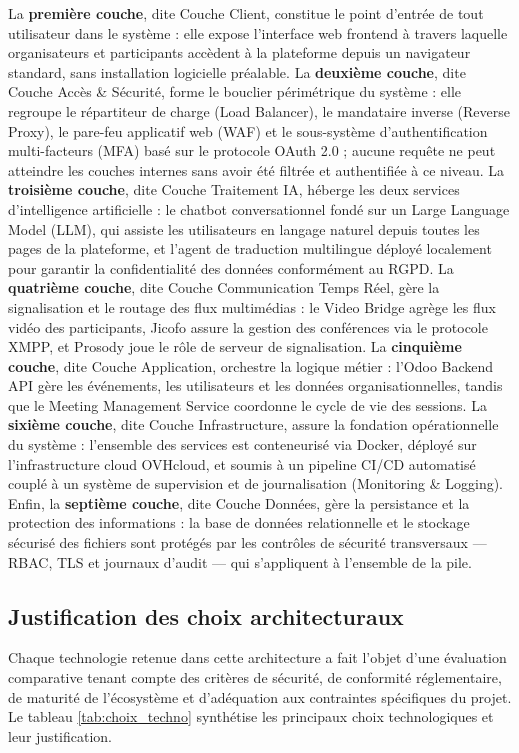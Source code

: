 La \textbf{première couche}, dite Couche Client, constitue le point d'entrée de tout utilisateur dans le système : elle expose l'interface web frontend à travers laquelle organisateurs et participants accèdent à la plateforme depuis un navigateur standard, sans installation logicielle préalable. La \textbf{deuxième couche}, dite Couche Accès \& Sécurité, forme le bouclier périmétrique du système : elle regroupe le répartiteur de charge (Load Balancer), le mandataire inverse (Reverse Proxy), le pare-feu applicatif web (WAF) et le sous-système d'authentification multi-facteurs (MFA) basé sur le protocole OAuth 2.0 ; aucune requête ne peut atteindre les couches internes sans avoir été filtrée et authentifiée à ce niveau. La \textbf{troisième couche}, dite Couche Traitement IA, héberge les deux services d'intelligence artificielle : le chatbot conversationnel fondé sur un Large Language Model (LLM), qui assiste les utilisateurs en langage naturel depuis toutes les pages de la plateforme, et l'agent de traduction multilingue déployé localement pour garantir la confidentialité des données conformément au RGPD. La \textbf{quatrième couche}, dite Couche Communication Temps Réel, gère la signalisation et le routage des flux multimédias : le Video Bridge agrège les flux vidéo des participants, Jicofo assure la gestion des conférences via le protocole XMPP, et Prosody joue le rôle de serveur de signalisation. La \textbf{cinquième couche}, dite Couche Application, orchestre la logique métier : l'Odoo Backend API gère les événements, les utilisateurs et les données organisationnelles, tandis que le Meeting Management Service coordonne le cycle de vie des sessions. La \textbf{sixième couche}, dite Couche Infrastructure, assure la fondation opérationnelle du système : l'ensemble des services est conteneurisé via Docker, déployé sur l'infrastructure cloud OVHcloud, et soumis à un pipeline CI/CD automatisé couplé à un système de supervision et de journalisation (Monitoring \& Logging). Enfin, la \textbf{septième couche}, dite Couche Données, gère la persistance et la protection des informations : la base de données relationnelle et le stockage sécurisé des fichiers sont protégés par les contrôles de sécurité transversaux — RBAC, TLS et journaux d'audit — qui s'appliquent à l'ensemble de la pile.

\subsection{Justification des choix architecturaux}
Chaque technologie retenue dans cette architecture a fait l'objet d'une évaluation comparative tenant compte des critères de sécurité, de conformité réglementaire, de maturité de l'écosystème et d'adéquation aux contraintes spécifiques du projet. Le tableau \ref{tab:choix_techno} synthétise les principaux choix technologiques et leur justification.

